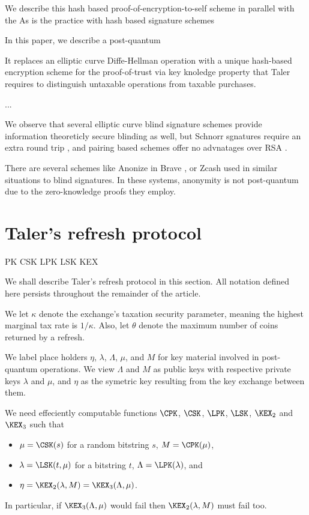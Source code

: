 \documentclass{llncs}
\begin{document}
We describe this hash based proof-of-encryption-to-self scheme in
parallel with the 
As is the practice with hash based signature schemes 




In this paper, we describe a post-quantum 

It replaces an elliptic curve Diffe-Hellman operation with a unique
hash-based encryption scheme for the proof-of-trust via key knoledge
property that Taler requires to distinguish untaxable operations from
taxable purchases. 

...

\smallskip

We observe that several elliptic curve blind signature schemes provide
information theoreticly secure blinding as well, but 
 Schnorr sgnatures require an extra round trip \cite{??}, and
 pairing based schemes offer no advnatages over RSA \cite{??}.

There are several schemes like Anonize \cite{} in Brave \cite{}, 
or Zcash \cite{} used in similar situations to blind signatures. 
In these systems, anonymity is not post-quantum due to the zero-knowledge
proofs they employ.


\section{Taler's refresh protocol}

\def\Mu{M}
\def\Eta{}
\def\newmathrm#1{\expandafter\newcommand\csname #1\endcsname{\mathrm{#1}}}
\newmathrm{CPK}
\newmathrm{CSK}
\newmathrm{LPK}
\newmathrm{LSK}
\newmathrm{KEX}


We shall describe Taler's refresh protocol in this section.
All notation defined here persists throughout the remainder of
 the article.

We let $\kappa$ denote the exchange's taxation security parameter,
meaning the highest marginal tax rate is $1/\kappa$.  Also, let 
$\theta$ denote the maximum number of coins returned by a refresh.

\smallskip

We label place holders $\eta$, $\lambda$, $\Lambda$, $\mu$, and $\Mu$
for key material involved in post-quantum operations.  
We view $\Lambda$ and $\Mu$ as public keys with respective
 private keys $\lambda$ and $\mu$, and
$\eta$ as the symetric key resulting from the key exchange between them.

We need effeciently computable functions
  $\CPK$, $\CSK$, $\LPK$, $\LSK$, $\KEX_2$ and $\KEX_3$  such that 
\begin{itemize}
\item  $\mu = \CSK(s)$ for a random bitstring $s$,
       $\Mu = \CPK(\mu)$,
\item  $\lambda = \LSK(t,\mu)$ for a bitstring $t$, 
       $\Lambda = \LPK(\lambda)$, and
\item $\eta = \KEX_2(\lambda,\Mu) = \KEX_3(\Lambda,\mu)$.
\end{itemize}
In particular, if $\KEX_3(\Lambda,\mu)$ would fail
 then $\KEX_2(\lambda,\Mu)$ must fail too.
\end{document}
